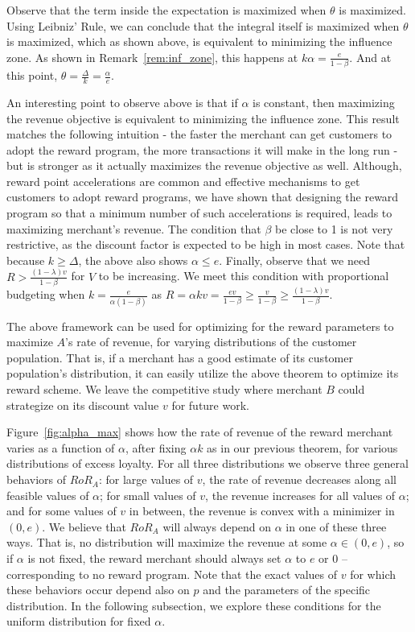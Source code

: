 Observe that the term inside the expectation is maximized when $\theta$ is maximized.
Using Leibniz' Rule, we can conclude that the integral itself is maximized when $\theta$ is maximized, which as shown above, is equivalent to minimizing the influence zone.
As shown in Remark~\ref{rem:inf_zone}, this happens at $k \alpha = \frac{e}{1-\beta}$. 
And at this point, $\theta = \frac{\Delta}{k} = \frac{\alpha}{e}$.
\endproof

An interesting point to observe above is that if $\alpha$ is constant, then maximizing the revenue objective is equivalent to minimizing the influence zone.
This result matches the following intuition - the faster the merchant can get customers to adopt the reward program, the more transactions it will make in the long run - but is stronger as it actually maximizes the revenue objective as well. 
Although, reward point accelerations are common and effective mechanisms to get customers to adopt reward programs, we have shown that designing the reward program so that a minimum number of such accelerations is required, leads to maximizing merchant's revenue. 
The condition that $\beta$ be close to 1 is not very restrictive, as the discount factor is expected to be high in most cases. 
Note that because $k \geq \Delta$, the above also shows $\alpha \leq e$. 
Finally, observe that we need $R > \frac{(1-\lambda)v}{1-\beta}$ for $V$ to be increasing. 
We meet this condition with proportional budgeting when $k = \frac{e}{\alpha(1-\beta)}$ as $R = \alpha k v = \frac{e v}{1-\beta} \geq \frac{v}{1-\beta} \geq \frac{(1-\lambda)v}{1-\beta}$. 

The above framework can be used for optimizing for the reward parameters to maximize $A$'s rate of revenue, for varying distributions of the customer population.
That is, if a merchant has a good estimate of its customer population's distribution, it can easily utilize the above theorem to optimize its reward scheme.
We leave the competitive study where merchant $B$ could strategize on its discount value $v$ for future work.

Figure~\ref{fig:alpha_max} shows how the rate of revenue of the reward merchant varies as a function of $\alpha$, after fixing $\alpha k$ as in our previous theorem, for various distributions of excess loyalty. For all three distributions we observe three general behaviors of $RoR_A$: for large values of $v$, the rate of revenue decreases along all feasible values of $\alpha$; for small values of $v$, the revenue increases for all values of $\alpha$; and for some values of $v$ in between, the revenue is convex with a minimizer in $(0, e)$. We believe that $RoR_A$ will always depend on $\alpha$ in one of these three ways. That is, no distribution will maximize the revenue at some $\alpha \in (0,e)$, so if $\alpha$ is not fixed, the reward merchant should always set $\alpha$ to $e$ or 0 -- corresponding to no reward program.
Note that the exact values of $v$ for which these behaviors occur depend also on $p$ and the parameters of the specific distribution. In the following subsection, we explore these conditions for the uniform distribution for fixed $\alpha$. 

